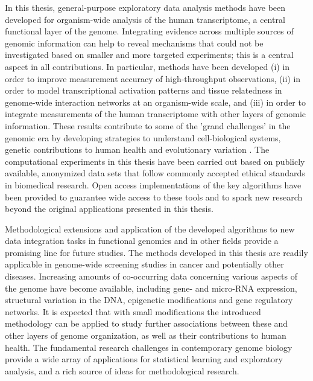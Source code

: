 In this thesis, general-purpose exploratory data analysis methods have
been developed for organism-wide analysis of the human transcriptome,
a central functional layer of the genome. Integrating evidence across
multiple sources of genomic information can help to reveal mechanisms
that could not be investigated based on smaller and more targeted
experiments; this is a central aspect in all contributions.  In
particular, methods have been developed (i) in order to improve
measurement accuracy of high-throughput observations, (ii) in order to
model transcriptional activation patterns and tissue relatedness in
genome-wide interaction networks at an organism-wide scale, and (iii)
in order to integrate measurements of the human transcriptome with
other layers of genomic information. These results contribute to some
of the 'grand challenges' in the genomic era by developing strategies
to understand cell-biological systems, genetic contributions to human
health and evolutionary variation \citep{Collins03}. The computational
experiments in this thesis have been carried out based on publicly
available, anonymized data sets that follow commonly accepted ethical
standards in biomedical research. Open access implementations of the
key algorithms have been provided to guarantee wide access to these
tools and to spark new research beyond the original applications
presented in this thesis.

Methodological extensions and application of the developed algorithms
to new data integration tasks in functional genomics and in other
fields provide a promising line for future studies. The methods
developed in this thesis are readily applicable in genome-wide
screening studies in cancer and potentially other diseases. Increasing
amounts of co-occurring data concerning various aspects of the genome
have become available, including gene- and micro-RNA expression,
structural variation in the DNA, epigenetic modifications and gene
regulatory networks. It is expected that with small modifications the
introduced methodology can be applied to study further associations
between these and other layers of genome organization, as well as
their contributions to human health. The fundamental research
challenges in contemporary genome biology provide a wide array of
applications for statistical learning and exploratory analysis, and a
rich source of ideas for methodological research.

